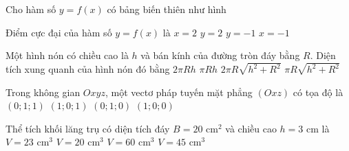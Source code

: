 \begin{ex}%
Cho hàm số $y=f(x)$ có bảng biến thiên như hình 
\begin{center}
\end{center}
Điểm cực đại của hàm số $y=f(x)$ là
\choice
{$x=2$}
{$y=2$}
{$y=-1$}
{\True $x=-1$}
\end{ex}

\begin{ex}%
Một hình nón có chiều cao là $h$ và bán kính của đường tròn đáy bằng $R$. Diện tích xung quanh của hình nón đó bằng
\choice
{$2 \pi R h$}
{$\pi R h$}
{$2 \pi R \sqrt{h^2+R^2}$}
{\True $\pi R \sqrt{h^2+R^2}$}
\end{ex}

\begin{ex}%
Trong không gian $Oxyz$, một vectơ pháp tuyến mặt phẳng $(Oxz)$ có tọa độ là
\choice
{$(0; 1; 1)$}
{$(1; 0; 1)$}
{\True $(0; 1; 0)$}
{$(1; 0; 0)$}
\end{ex}

\begin{ex}%
Thể tích khối lăng trụ có diện tích đáy $B=20 \text{~cm}^2$ và chiều cao $h=3 \text{~cm}$ là
\choice
{$V=23 \text{~cm}^3$}
{$V=20 \text{~cm}^3$}
{\True $V=60 \text{~cm}^3$}
{$V=45 \text{~cm}^3$}
\end{ex}

